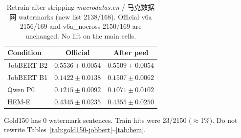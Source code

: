 \begin{table}[t]
\caption{Retrain after stripping \emph{macrodatas.cn} / 马克数据网 watermarks (new list 2138/168). Official v6a 2156/169 and v6a\_nocross 2150/169 are unchanged. No lift on the main cells.}
\label{tab:peel-rerun}
\centering
\begin{tabular}{lcc}
\hline
Condition & Official & After peel \\
\hline
JobBERT B2 & $0.5536\pm0.0054$ & $0.5509\pm0.0054$ \\
JobBERT B1 & $0.1422\pm0.0138$ & $0.1507\pm0.0062$ \\
Qwen P0 & $0.1215\pm0.0092$ & $0.1071\pm0.0102$ \\
HEM-E & $0.4345\pm0.0235$ & $0.4355\pm0.0250$ \\
\hline
\end{tabular}

\vspace{0.4em}
{\small Gold150 has 0 watermark sentences.
Train hits were 23/2150 ($\approx$1\%).
Do not rewrite Tables~\ref{tab:gold150-jobbert}--\ref{tab:hem}.}
\end{table}
